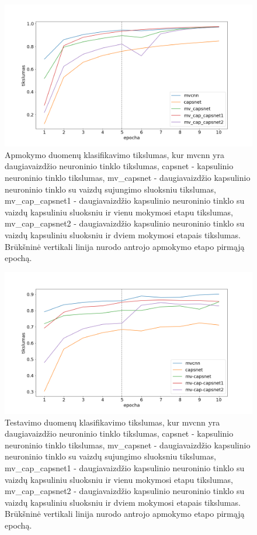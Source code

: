 \begin{figure}[H]
	\centering
	\includegraphics[scale=0.5]{img/trained.png}
	\caption{
		Apmokymo duomenų klasifikavimo tikslumas, kur mvcnn yra daugiavaizdžio neuroninio tinklo tikslumas, capsnet - kapsulinio neuroninio tinklo tikslumas, mv\_capsnet - daugiavaizdžio kapsulinio neuroninio tinklo su vaizdų sujungimo sluoksniu tikslumas, mv\_cap\_capsnet1 - daugiavaizdžio kapsulinio neuroninio tinklo su vaizdų kapsuliniu sluoksniu ir vienu mokymosi etapu tikslumas, mv\_cap\_capsnet2 - daugiavaizdžio kapsulinio neuroninio tinklo su vaizdų kapsuliniu sluoksniu ir dviem mokymosi etapais tikslumas. Brūkšninė vertikali linija nurodo antrojo apmokymo etapo pirmąją epochą.
	}
	\label{img:train_plot}
\end{figure}

\begin{figure}[H]
	\centering
	\includegraphics[scale=0.5]{img/validated.png}
	\caption{
		Testavimo duomenų klasifikavimo tikslumas, kur mvcnn yra daugiavaizdžio neuroninio tinklo tikslumas, capsnet - kapsulinio neuroninio tinklo tikslumas, mv\_capsnet - daugiavaizdžio kapsulinio neuroninio tinklo su vaizdų sujungimo sluoksniu tikslumas, mv\_cap\_capsnet1 - daugiavaizdžio kapsulinio neuroninio tinklo su vaizdų kapsuliniu sluoksniu ir vienu mokymosi etapu tikslumas, mv\_cap\_capsnet2 - daugiavaizdžio kapsulinio neuroninio tinklo su vaizdų kapsuliniu sluoksniu ir dviem mokymosi etapais tikslumas. Brūkšninė vertikali linija nurodo antrojo apmokymo etapo pirmąją epochą.
	}
	\label{img:val_plot}
\end{figure}

